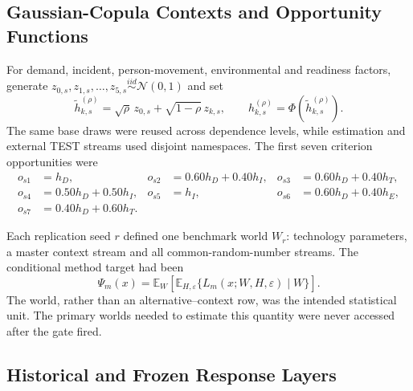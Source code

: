 \documentclass[runningheads,orivec]{llncs}
\newcommand{\E}{\mathbb{E}}
\begin{document}
\subsection{Gaussian-Copula Contexts and Opportunity Functions}

For demand, incident, person-movement, environmental and readiness factors, generate
$z_{0,s},z_{1,s},\ldots,z_{5,s}\overset{iid}{\sim}\mathcal N(0,1)$ and set
\begin{equation}
\widetilde h_{k,s}^{(\rho)}
=\sqrt{\rho}\,z_{0,s}+\sqrt{1-\rho}\,z_{k,s},
\qquad h_{k,s}^{(\rho)}=\Phi(\widetilde h_{k,s}^{(\rho)}).
\label{supp:eq:copula}
\end{equation}
The same base draws were reused across dependence levels, while estimation and external TEST
streams used disjoint namespaces. The first seven criterion opportunities were
\begin{align}
o_{s1}&=h_D, & o_{s2}&=0.60h_D+0.40h_I, & o_{s3}&=0.60h_D+0.40h_T,\nonumber\\
o_{s4}&=0.50h_D+0.50h_I, & o_{s5}&=h_I, & o_{s6}&=0.60h_D+0.40h_E,\nonumber\\
o_{s7}&=0.40h_D+0.60h_T.&&&
\label{supp:eq:opportunities}
\end{align}

Each replication seed $r$ defined one benchmark world $W_r$: technology parameters, a master
context stream and all common-random-number streams. The conditional method target had been
\begin{equation}
\Psi_m(x)=\E_W\!\left[\E_{H,\varepsilon}
\{L_m(x;W,H,\varepsilon)\mid W\}\right].
\label{supp:eq:estimand}
\end{equation}
The world, rather than an alternative--context row, was the intended statistical unit. The
primary worlds needed to estimate this quantity were never accessed after the gate fired.

\subsection{Historical and Frozen Response Layers}
\end{document}
